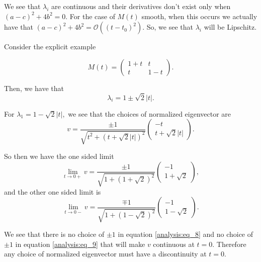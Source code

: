 We see that $\lambda_i$ are continuous and their derivatives don't exist only when $(a-c)^2 + 4b^2 = 0.$ For the case of $M(t)$ smooth, when this occurs we actually have that $(a-c)^2 + 4b^2 = \mathcal O((t-t_0)^2).$ So, we see that $\lambda_i$ will be Lipschitz.

\begin{example}
Consider the explicit example

\begin{equation}
M(t) = \begin{pmatrix}
1 + t & t\\
t & 1-t
\end{pmatrix}.
\end{equation}

Then, we have that
\begin{equation}
\lambda_i = 1 \pm \sqrt{2}|t|.
\end{equation}

For $\lambda_1 = 1-\sqrt{2}|t|,$ we see that the choices of normalized eigenvector are
\begin{equation}
v = \frac{\pm 1}{\sqrt{t^2 + (t+\sqrt{2}|t|)^2}}\begin{pmatrix} -t \\ t+\sqrt{2}|t|  \end{pmatrix}.
\end{equation}

So then we have the one sided limit
\begin{equation}\label{analysis:eq_8}
\lim\limits_{t\to 0+} v = \frac{\pm 1}{\sqrt{1+(1+\sqrt{2})^2}}\begin{pmatrix}-1 \\ 1 + \sqrt{2} \end{pmatrix},
\end{equation}
and the other one sided limit is
\begin{equation}\label{analysis:eq_9}
\lim\limits_{t\to 0-} v = \frac{\mp 1}{\sqrt{1+(1-\sqrt{2})^2}}\begin{pmatrix}-1 \\ 1 - \sqrt{2} \end{pmatrix}.
\end{equation}

We see that there is no choice of $\pm 1$ in equation \eqref{analysis:eq_8} and no choice of $\pm 1$ in equation \eqref{analysis:eq_9} that will make $v$ continuous at $t=0$. Therefore any choice of normalized eigenvector must have a discontinuity at $t=0$.
\end{example}

